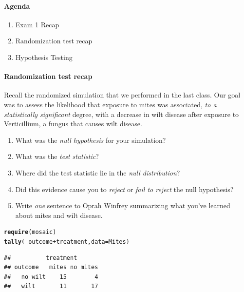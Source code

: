 \documentclass[10pt]{article}\usepackage[]{graphicx}\usepackage[]{color}
\makeatletter
\newcommand{\hlopt}[1]{\textcolor[rgb]{0,0,0}{#1}}%
\newcommand{\hlstd}[1]{\textcolor[rgb]{0.345,0.345,0.345}{#1}}%
\newcommand{\hlkwc}[1]{\textcolor[rgb]{0.333,0.667,0.333}{#1}}%
\newcommand{\hlkwd}[1]{\textcolor[rgb]{0.737,0.353,0.396}{\textbf{#1}}}%
\newenvironment{kframe}{%
 \def\at@end@of@kframe{}%
 \ifinner\ifhmode%
  \def\at@end@of@kframe{\end{minipage}}%
  \begin{minipage}{\columnwidth}%
 \fi\fi%
 \def\FrameCommand##1{\hskip\@totalleftmargin \hskip-\fboxsep
 \colorbox{shadecolor}{##1}\hskip-\fboxsep
     \hskip-\linewidth \hskip-\@totalleftmargin \hskip\columnwidth}%
 \MakeFramed {\advance\hsize-\width
   \@totalleftmargin\z@ \linewidth\hsize
   \@setminipage}}%
 {\par\unskip\endMakeFramed%
 \at@end@of@kframe}
\newenvironment{knitrout}{}{} %
\newcommand{\ans}{\vspace{0.25in}}
\makeatother
\begin{document}
\paragraph{Agenda}
\begin{enumerate}
  \itemsep0em
  \item Exam 1 Recap
  \item Randomization test recap
  \item Hypothesis Testing
\end{enumerate}


\paragraph{Randomization test recap}

Recall the randomized simulation that we performed in the last class. Our goal was to assess the likelihood that exposure to mites was associated, \emph{to a statistically significant} degree, with a decrease in wilt disease after exposure to Verticillium, a fungus that causes wilt disease. 

\begin{enumerate}
  \itemsep0.75in
  \item What was the \emph{null hypothesis} for your simulation?
  \item What was the \emph{test statistic}?
  \item Where did the test statistic lie in the \emph{null distribution}? 
  \item Did this evidence cause you to \emph{reject} or \emph{fail to reject} the null hypothesis?
  \item Write \emph{one} sentence to Oprah Winfrey summarizing what you've learned about mites and wilt disease.  
  \ans
\end{enumerate}

\begin{knitrout}\footnotesize
{}\color{fgcolor}\begin{kframe}
\begin{alltt}
\hlkwd{require}\hlstd{(mosaic)}
\hlkwd{tally}\hlstd{(}\hlopt{~} \hlstd{outcome} \hlopt{+} \hlstd{treatment,} \hlkwc{data} \hlstd{= Mites)}
\end{alltt}
\begin{verbatim}
##          treatment
## outcome   mites no mites
##   no wilt    15        4
##   wilt       11       17
\end{verbatim}
\end{kframe}
\end{knitrout}
\end{document}
